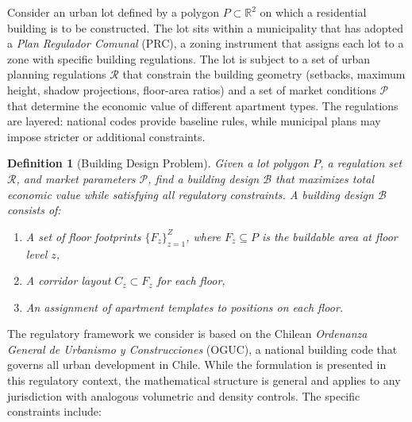 \documentclass[11pt,a4paper]{article}
\newtheorem{definition}{Definition}
\newcommand{\R}{\mathbb{R}}
\newcommand{\calP}{\mathcal{P}}
\newcommand{\calR}{\mathcal{R}}
\begin{document}
Consider an urban lot defined by a polygon $P \subset \R^2$ on which a
residential building is to be constructed. The lot sits within a
municipality that has adopted a \emph{Plan Regulador Comunal} (PRC), a
zoning instrument that assigns each lot to a zone with specific building
regulations. The lot is subject to a set of urban planning regulations
$\calR$ that constrain the building geometry (setbacks, maximum height,
shadow projections, floor-area ratios) and a set of market conditions
$\calP$ that determine the economic value of different apartment types.
The regulations are layered: national codes provide baseline rules, while
municipal plans may impose stricter or additional constraints.

\begin{definition}[Building Design Problem]
Given a lot polygon $P$, a regulation set $\calR$, and market parameters
$\calP$, find a building design $\mathcal{B}$ that maximizes total economic
value while satisfying all regulatory constraints. A building design
$\mathcal{B}$ consists of:
\begin{enumerate}[label=(\roman*)]
    \item A set of floor footprints $\{F_z\}_{z=1}^{Z}$, where $F_z \subseteq P$ is the buildable area at floor level $z$,
    \item A corridor layout $C_z \subset F_z$ for each floor,
    \item An assignment of apartment templates to positions on each floor.
\end{enumerate}
\end{definition}

The regulatory framework we consider is based on the Chilean
\emph{Ordenanza General de Urbanismo y Construcciones} (OGUC), a national
building code that governs all urban development in Chile. While the
formulation is presented in this regulatory context, the mathematical
structure is general and applies to any jurisdiction with analogous
volumetric and density controls. The specific constraints include:
\end{document}
